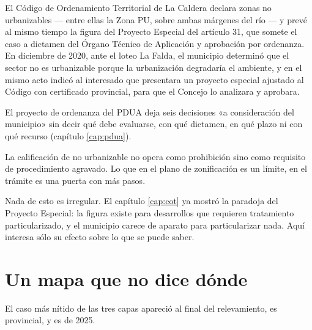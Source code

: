 El Código de Ordenamiento Territorial de La Caldera declara zonas no urbanizables --- entre ellas la Zona PU, sobre ambas márgenes del río --- y prevé al mismo tiempo la figura del Proyecto Especial del artículo 31, que somete el caso a dictamen del Órgano Técnico de Aplicación y aprobación por ordenanza. En diciembre de 2020, ante el loteo La Falda, el municipio determinó que el sector no es urbanizable porque la urbanización degradaría el ambiente, y en el mismo acto indicó al interesado que presentara un proyecto especial ajustado al Código con certificado provincial, para que el Concejo lo analizara y aprobara.

El proyecto de ordenanza del PDUA deja seis decisiones «a consideración del municipio» sin decir qué debe evaluarse, con qué dictamen, en qué plazo ni con qué recurso (capítulo \ref{cap:pdua}).

La calificación de no urbanizable no opera como prohibición sino como requisito de procedimiento agravado. Lo que en el plano de zonificación es un límite, en el trámite es una puerta con más pasos.

Nada de esto es irregular. El capítulo \ref{cap:cot} ya mostró la paradoja del Proyecto Especial: la figura existe para desarrollos que requieren tratamiento particularizado, y el municipio carece de aparato para particularizar nada. Aquí interesa sólo su efecto sobre lo que se puede saber.

\section{Un mapa que no dice dónde}

El caso más nítido de las tres capas apareció al final del relevamiento, es provincial, y es de 2025.

